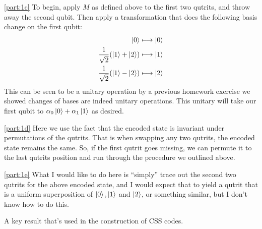 \documentclass[boxes,pages]{homework}
\begin{document}
\begin{solution}
	\ref{part:1c}
	To begin, apply $M$ as defined above to the first two qutrits, and throw away the second qubit. Then apply a transformation that does the following basis change on the first qubit:
	\begin{align*}
		\ket{0}                                   & \longmapsto \ket{0} \\
		\frac{1}{\sqrt{2}}\qty(\ket{1} + \ket{2}) & \longmapsto \ket{1} \\
		\frac{1}{\sqrt{2}}\qty(\ket{1} - \ket{2}) & \longmapsto \ket{2}
	\end{align*}
	This can be seen to be a unitary operation by a previous homework exercise we showed changes of bases are indeed unitary operations. This unitary will take our first qubit to $\alpha_0\ket{0} + \alpha_1\ket{1}$ as desired.

	\ref{part:1d}
	Here we use the fact that the encoded state is invariant under permutations of the qutrits. That is when swapping any two qutrits, the encoded state remains the same. So, if the first qutrit goes missing, we can permute it to the last qutrits position and run through the procedure we outlined above.

	\ref{part:1e}
	What I would like to do here is ``simply'' trace out the second two qutrits for the above encoded state, and I would expect that to yield a qutrit that is a uniform superposition of $\ket{0}, \ket{1}$ and $\ket{2}$, or something similar, but I don't know how to do this. \frownie
\end{solution}

\begin{problem}
A key result that's used in the construction of CSS codes.
\end{problem}
\end{document}
